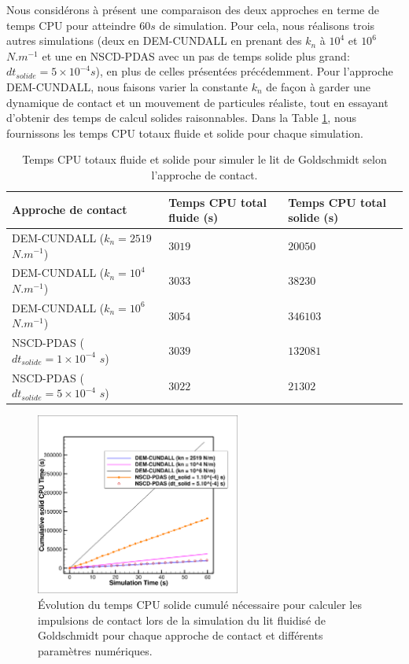 Nous considérons à présent une comparaison des deux approches en terme de temps CPU pour atteindre $60s$ de simulation. Pour cela, nous réalisons trois autres simulations  (deux en DEM-CUNDALL en prenant des $k_n$ à $10^4$ et $10^6$ $N.m^{-1}$ et une en NSCD-PDAS avec un pas de temps solide plus grand: $dt_{solide} = 5\times10^{-4} s$), en plus de celles présentées précédemment. Pour l'approche DEM-CUNDALL, nous faisons varier la constante $k_n$ de façon à garder une dynamique de contact et un mouvement de particules réaliste, tout en essayant d'obtenir des temps de calcul solides raisonnables. Dans la Table \ref{tab_cpu_lit}, nous fournissons les temps CPU totaux fluide et solide pour chaque simulation.

\begin{table}[!h]
\begin{tabular}{|p{6.5cm}|p{3.1cm}|p{3.1cm}|}
  \hline \rowcolor{lightgray}
  Approche de contact & Temps CPU total fluide (s) & Temps CPU total solide (s)\\ 
  \hline  DEM-CUNDALL ($k_n = 2519$ $N.m^{-1}$) & $3019$ & $20050$\\
  DEM-CUNDALL ($k_n = 10^4$ $N.m^{-1}$) & $3033$ & $38230$\\
  DEM-CUNDALL ($k_n = 10^6$ $N.m^{-1}$) & $3054$ & $346103$\\
  NSCD-PDAS ($dt_{solide} = 1\times10^{-4}$ $s$)& $3039$ & $132081$\\ 
  NSCD-PDAS ($dt_{solide} = 5\times10^{-4}$ $s$)& $3022$ & $21302$\\ 
 \hline
\end{tabular}
 \caption{Temps CPU totaux fluide et solide pour simuler le lit de Goldschmidt selon l'approche de contact.}\label{tab_cpu_lit}
\end{table}

\begin{figure}[!h]
  \centering
    \includegraphics[width=0.6\textwidth]{chapitres/chapitre_4/figures/cumul_solid_cpu_time.png}
    \caption{\centering Évolution du temps CPU solide cumulé nécessaire pour calculer les impulsions de contact lors de la simulation du lit fluidisé de Goldschmidt pour chaque approche de contact et différents paramètres numériques.}\label{cumul_solid_cpu_time}
\end{figure}

